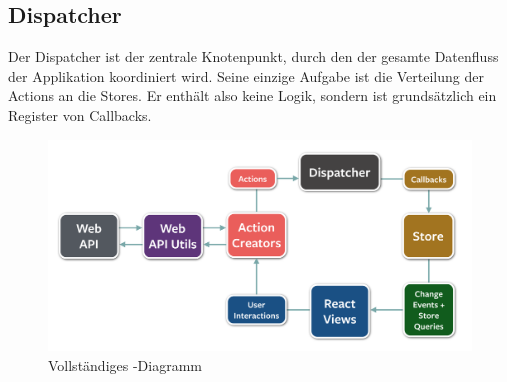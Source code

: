 \subsection{Dispatcher}
\label{pd-flux-dispatcher}
Der Dispatcher ist der zentrale Knotenpunkt, durch den der gesamte Datenfluss der Applikation koordiniert wird.
Seine einzige Aufgabe ist die Verteilung der Actions an die Stores.
Er enthält also keine  Logik, sondern ist grundsätzlich ein Register von Callbacks.\newline
\begin{figure}[H]
 	\centering
 	\includegraphics[width=\textwidth]{images/projektdokumentation/flux-diagram.png}
 	\caption{Vollständiges -Diagramm}
 	\label{image-flux-overview-detailed}
\end{figure}
